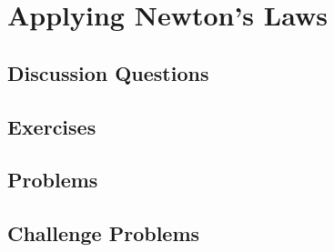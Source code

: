 
\chapter{Applying Newton's Laws}

\section{Discussion Questions}

\section{Exercises}

\section{Problems}

\section{Challenge Problems}
